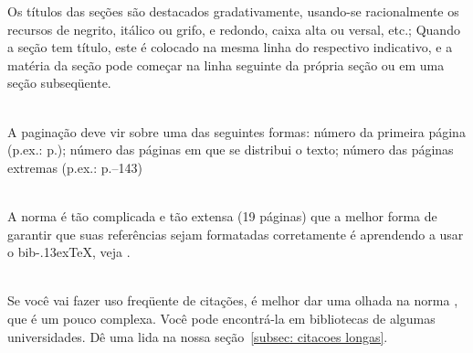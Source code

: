 \documentclass[espaco=simples,appendix=Name]{abnt}
\newcommand{\descrtype}{descriptionbf}
\renewenvironment{description}%
  {\expandafter\csname\descrtype\endcsname\edef\enddescrtype{end\descrtype}}
  {\expandafter\csname\enddescrtype\endcsname}
\newcommand{\bibTeX}{bib\kern-.13ex\TeX}%
\newcommand{\ingles}[1]{\textsl{#1}}
\begin{document}
{\begin{description}
  \cite[seção~5]{NBR6024:1989} Os títulos das seções são destacados
  gradativamente, usando-se racionalmente os recursos de negrito, itálico
  ou grifo, e redondo, caixa alta ou versal, etc.; Quando a seção tem
  título, este é colocado na mesma linha do respectivo indicativo, e a
  matéria da seção pode começar na linha seguinte da própria seção ou em
  uma seção subseqüente.

\item[Sumário]\ \\ \cite[seção~4.1.d]{NBR6027:1989} A paginação deve vir sobre uma
  das seguintes formas: número da primeira página (p.\thinspace ex.:
  p.); número das páginas em que se distribui o texto; número
  das páginas extremas (p.\thinspace ex.: p.--143)

\item[Referências bibliográficas]\ \\ A norma \cite{NBR6023:2002} é tão
  complicada e tão extensa (19 páginas) que a melhor forma de garantir que
  suas referências sejam formatadas corretamente é aprendendo a usar o
  \bibTeX{}, veja \cite{abnt-bibtex-doc,abnt-bibtex-alf-doc}.

\item[Citações Textuais]\ \\ Se você vai fazer uso freqüente de citações, é melhor
  dar uma olhada na norma \cite{NBR10520:2001}, que é um pouco
  complexa. Você pode encontrá-la em bibliotecas de algumas
  universidades. Dê uma lida na nossa seção~\ref{subsec: citacoes longas}.

\end{description}

}




%
\end{document}

